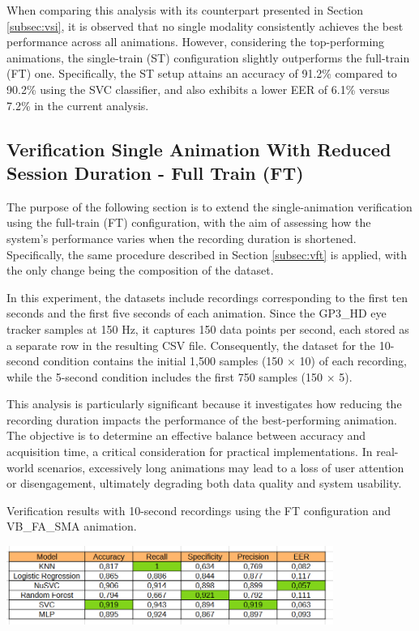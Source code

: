 \documentclass[12pt]{report}
\begin{document}
When comparing this analysis with its counterpart presented in Section \ref{subsec:vsi}, it is observed that no single modality consistently achieves the best performance across all animations. 
However, considering the top-performing animations, the single-train (ST) configuration slightly outperforms the full-train (FT) one. 
Specifically, the ST setup attains an accuracy of 91.2\% compared to 90.2\% using the SVC classifier, and also exhibits a lower EER of 6.1\% versus 7.2\% in the current analysis.
\FloatBarrier

\subsection{Verification Single Animation With Reduced Session Duration - Full Train (FT)}

The purpose of the following section is to extend the single-animation verification using the full-train (FT) configuration, with the aim of assessing how the system’s performance varies when the recording duration is shortened. 
Specifically, the same procedure described in Section \ref{subsec:vft} is applied, with the only change being the composition of the dataset.

In this experiment, the datasets include recordings corresponding to the first ten seconds and the first five seconds of each animation. 
Since the GP3\_HD eye tracker samples at 150 Hz, it captures 150 data points per second, each stored as a separate row in the resulting CSV file. 
Consequently, the dataset for the 10-second condition contains the initial 1,500 samples (150 × 10) of each recording, while the 5-second condition includes the first 750 samples (150 × 5).

This analysis is particularly significant because it investigates how reducing the recording duration impacts the performance of the best-performing animation. 
The objective is to determine an effective balance between accuracy and acquisition time, a critical consideration for practical implementations. 
In real-world scenarios, excessively long animations may lead to a loss of user attention or disengagement, ultimately degrading both data quality and system usability.

\begin{table}[ht]
    \centering
    \caption{Verification results with 10-second recordings using the FT configuration and VB\_FA\_SMA animation.}
    \includegraphics[width=0.8\textwidth]{Images/Results/Verification_single_five_ten/ft/ten/VB_FA_LIT.png}
    \label{tab:VB_FA_LIT_10_ft}
\end{table}
\end{document}
